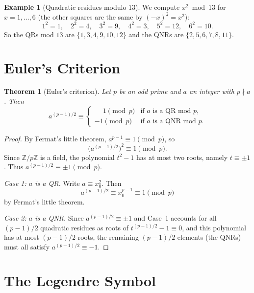\documentclass[12pt,a4paper,openany]{book}
\theoremstyle{definition}
\newtheorem{example}[definition]{Example}
\theoremstyle{plain}
\newtheorem{theorem}[definition]{Theorem}
\theoremstyle{remark}
\newcommand{\Z}{\mathbb{Z}}
\begin{document}
\begin{example}[Quadratic residues modulo $13$]
\label{ex:qr-mod-13}
We compute $x^2 \bmod 13$ for $x = 1, \ldots, 6$
(the other squares are the same by $(-x)^2 = x^2$):
\[
  1^2 = 1,\quad 2^2 = 4,\quad 3^2 = 9,\quad 4^2 = 3,\quad 5^2 = 12,\quad 6^2 = 10.
\]
So the QRs mod $13$ are $\{1, 3, 4, 9, 10, 12\}$ and the QNRs are $\{2, 5, 6, 7, 8, 11\}$.
\end{example}

\section{Euler's Criterion}
\label{sec:euler-criterion}

\begin{theorem}[Euler's criterion]
\label{thm:euler-criterion}
Let $p$ be an odd prime and $a$ an integer with $p \nmid a$. Then
\begin{equation}
\label{eq:euler-criterion}
  a^{(p-1)/2} \equiv
  \begin{cases}
    \phantom{-}1 \pmod{p} & \text{if } a \text{ is a QR mod } p, \\
    -1 \pmod{p} & \text{if } a \text{ is a QNR mod } p.
  \end{cases}
\end{equation}
\end{theorem}

\begin{proof}
By Fermat's little theorem, $a^{p-1} \equiv 1 \pmod{p}$, so
\[
  \bigl(a^{(p-1)/2}\bigr)^2 \equiv 1 \pmod{p}.
\]
Since $\Z/p\Z$ is a field, the polynomial $t^2 - 1$ has at most two roots, namely
$t \equiv \pm 1$. Thus $a^{(p-1)/2} \equiv \pm 1 \pmod{p}$.

\emph{Case 1: $a$ is a QR.} Write $a \equiv x_0^2$. Then
\[
  a^{(p-1)/2} \equiv x_0^{p-1} \equiv 1 \pmod{p}
\]
by Fermat's little theorem.

\emph{Case 2: $a$ is a QNR.} Since $a^{(p-1)/2} \equiv \pm 1$ and Case~1 accounts
for all $(p-1)/2$ quadratic residues as roots of $t^{(p-1)/2} - 1 \equiv 0$,
and this polynomial has at most $(p-1)/2$ roots, the remaining $(p-1)/2$ elements
(the QNRs) must all satisfy $a^{(p-1)/2} \equiv -1$.
\end{proof}

\section{The Legendre Symbol}
\label{sec:legendre-symbol}
\end{document}
